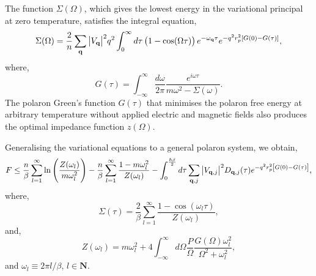 The function $\Sigma(\Omega)$, which gives the lowest energy in the variational principal at zero temperature, satisfies the integral equation,
\begin{equation}
    \Sigma(\Omega) = \frac{2}{n} \sum_{\vb{q}} \abs{V_{\vb{q}}}^2 q^2 \int^\infty_0 d\tau \left( 1 - \cos(\Omega \tau) \right)  e^{-\omega_{\vb{q}} \tau} e^{-q^2 r_p^2 [G(0) - G(\tau)]}, 
\end{equation}
where,
\begin{equation}
    G(\tau) = \int_{-\infty}^\infty \frac{d\omega}{2\pi} \frac{ e^{i \omega \tau} }{m \omega^2 - \Sigma(\omega)} .
\end{equation}
The polaron Green's function $G(\tau)$ that minimises the polaron free energy at arbitrary temperature without applied electric and magnetic fields also produces the optimal impedance function $z(\Omega)$. 

Generalising the variational equations to a general polaron system, we obtain,
\begin{equation}
    F \leq \frac{n}{\beta} \sum_{l=1}^\infty \ln \left( \frac{Z(\omega_l)}{m \omega_l^2} \right) - \frac{n}{\beta} \sum_{l=1}^\infty \frac{1 - m \omega^2_l}{Z(\omega_l)} - \int_0^{\frac{\hbar\beta}{2}} d\tau \sum_{\vb{q}, j} \abs{V_{\vb{q}, j}}^2 D_{\vb{q}, j}(\tau) e^{-q^2 r_p^2 \left[G(0) - G(\tau)\right]},
\end{equation}
where,
\begin{equation}
    \Sigma(\tau) = \frac{2}{\beta} \sum_{l = 1}^\infty \frac{1 - \cos\left(\omega_l \tau \right)}{Z(\omega_l)},
\end{equation}
and,
\begin{equation}
    Z(\omega_l) = m \omega_l^2 + 4 \int_{-\infty}^\infty d\Omega \frac{P}{\Omega} \frac{G(\Omega) \omega^2_l}{\Omega^2 + \omega_l^2},
\end{equation}
and $\omega_l \equiv 2\pi l / \beta$, $l \in \mathbf{N}$.